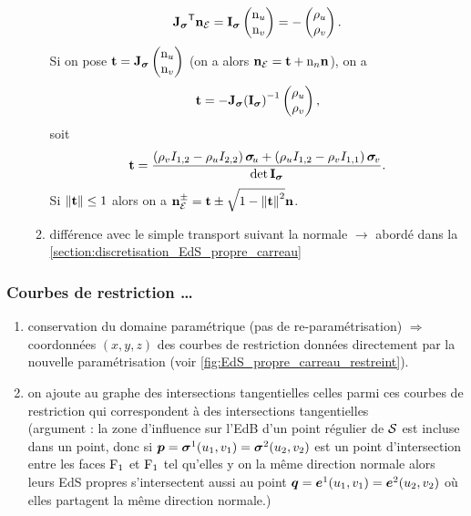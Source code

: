 \begin{enumerate}
\begin{enumerate}
		\[
			{\mathbf{J}_{\bm{\sigma}}} ^\mathsf{T} \mathbf{n}_{\mathcal{E}} = \mathbf{I}_{\bm{\sigma}} \begin{pmatrix} \mathrm{n}_u \\ \mathrm{n}_v \end{pmatrix} = -\begin{pmatrix} \rho_u \\ \rho_v \end{pmatrix}.
		\]
		Si on pose $\mathbf{t} = \mathbf{J}_{\bm{\sigma}} \begin{pmatrix} \mathrm{n}_u \\ \mathrm{n}_v \end{pmatrix}$ (on a alors $\mathbf{n}_{\mathcal{E}} = \mathbf{t} + \mathrm{n}_n \mathbf{n}$), on a
		\[
			\mathbf{t} = - \mathbf{J}_{\bm{\sigma}} { \left(\mathbf{I}_{\bm{\sigma}}\right) } ^{-1} \begin{pmatrix} \rho_u \\ \rho_v \end{pmatrix},
		\]
		soit
		\[
			\mathbf{t} = \frac{
				\left( \rho_v I_{1,2} - \rho_u I_{2,2} \right) \bm{\sigma}_{\mkern-3muu} + 
				\left( \rho_u I_{1,2} - \rho_v I_{1,1} \right) \bm{\sigma}_{\mkern-2muv}
			}{
				\det{\mathbf{I}_{\bm{\sigma}}}
			}.
		\]
		Si $\left\| {\mathbf{t}} \right\| \leq 1$ alors on a $\mathbf{n}_{\mathcal{E}}^{\pm} = \mathbf{t} \pm \sqrt{1 - \left\| {\mathbf{t}} \right\|^2} \mathbf{n}$.
				
		\item différence avec le simple transport suivant la normale $\to$ abordé dans la \autoref{section:discretisation_EdS_propre_carreau}
	\end{enumerate}
\end{enumerate}




\subsubsection{Courbes de restriction \ldots}
\begin{enumerate}
	\item conservation du domaine paramétrique (pas de re-paramétrisation) $\Rightarrow$ coordonnées $(x,y,z)$ des courbes de restriction données directement par la nouvelle paramétrisation (voir \autoref{fig:EdS_propre_carreau_restreint}).
	\item on ajoute au graphe des intersections tangentielles celles parmi ces courbes de restriction qui correspondent à des intersections tangentielles\\
	(argument : la zone d'influence sur l'EdB d'un point régulier de $\mathcal{S}$ est incluse dans un point, donc si $\bm{p} = \bm{\sigma}^1(u_1,v_1) = \bm{\sigma}^2(u_2,v_2)$ est un point d'intersection entre les faces $\mathrm{F}_1$ et $\mathrm{F}_1$ tel qu'elles y on la même direction normale alors leurs EdS propres s'intersectent aussi au point $\bm{q} = \bm{e}^1(u_1,v_1) = \bm{e}^2(u_2,v_2)$ où elles partagent la même direction normale.) 
\end{enumerate}




